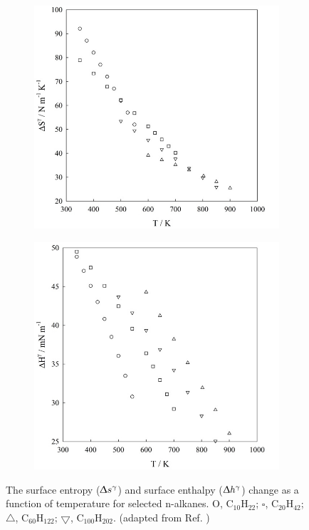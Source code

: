 \documentclass[9pt,bestpractices]{livecoms}
\begin{document}
\begin{figure}[h]
	\centering
	\begin{subfigure}{0.68\linewidth} %
    \includegraphics[width=1\textwidth]{gfx/image68.jpeg}
	\end{subfigure}
	\begin{subfigure}{0.68\linewidth} %
    \includegraphics[width=1\textwidth]{gfx/image69.jpeg}
	\end{subfigure}
\caption{The surface entropy (${\Updelta}s^{\mathrm{{\gamma}}}$)
and surface enthalpy (${\Updelta}h^{\mathrm{{\gamma}}}$) change as
a function of temperature for selected n-alkanes. O, C$_{10}$H$_{22}$;
${\square}$, C$_{20}$H$_{42}$; ${\bigtriangleup}$, C$_{60}$H$_{122}$;
${\bigtriangledown}$, C$_{100}$H$_{202}$. (adapted from Ref. \citep{muller2011})}
\label{fig:22}
\end{figure}
\end{document}
